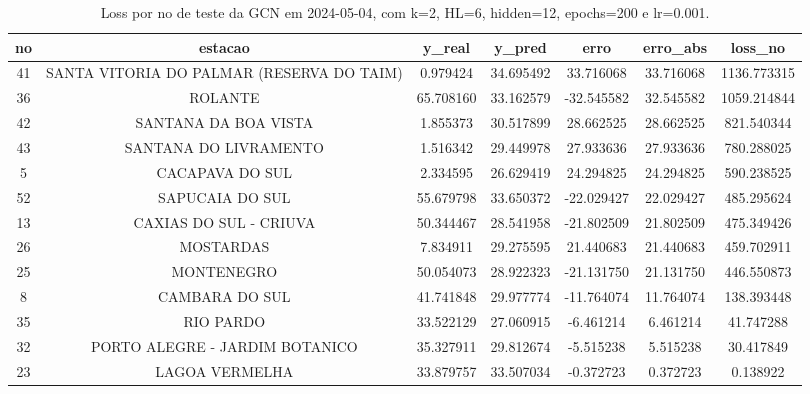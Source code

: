 \begin{table}[h]
\centering
\caption{Loss por no de teste da GCN em 2024-05-04, com k=2, HL=6, hidden=12, epochs=200 e lr=0.001.}
\label{tab:gcn_loss_k2_hl6_h12_e200_d20240504}
\begin{tabular}{ccccccc}
\toprule
no & estacao & y\_real & y\_pred & erro & erro\_abs & loss\_no \\
\midrule
41 & SANTA VITORIA DO PALMAR (RESERVA DO TAIM) & 0.979424 & 34.695492 & 33.716068 & 33.716068 & 1136.773315 \\
36 & ROLANTE & 65.708160 & 33.162579 & -32.545582 & 32.545582 & 1059.214844 \\
42 & SANTANA DA BOA VISTA & 1.855373 & 30.517899 & 28.662525 & 28.662525 & 821.540344 \\
43 & SANTANA DO LIVRAMENTO & 1.516342 & 29.449978 & 27.933636 & 27.933636 & 780.288025 \\
5 & CACAPAVA DO SUL & 2.334595 & 26.629419 & 24.294825 & 24.294825 & 590.238525 \\
52 & SAPUCAIA DO SUL & 55.679798 & 33.650372 & -22.029427 & 22.029427 & 485.295624 \\
13 & CAXIAS DO SUL - CRIUVA & 50.344467 & 28.541958 & -21.802509 & 21.802509 & 475.349426 \\
26 & MOSTARDAS & 7.834911 & 29.275595 & 21.440683 & 21.440683 & 459.702911 \\
25 & MONTENEGRO & 50.054073 & 28.922323 & -21.131750 & 21.131750 & 446.550873 \\
8 & CAMBARA DO SUL & 41.741848 & 29.977774 & -11.764074 & 11.764074 & 138.393448 \\
35 & RIO PARDO & 33.522129 & 27.060915 & -6.461214 & 6.461214 & 41.747288 \\
32 & PORTO ALEGRE - JARDIM BOTANICO & 35.327911 & 29.812674 & -5.515238 & 5.515238 & 30.417849 \\
23 & LAGOA VERMELHA & 33.879757 & 33.507034 & -0.372723 & 0.372723 & 0.138922 \\
\bottomrule
\end{tabular}
\end{table}

